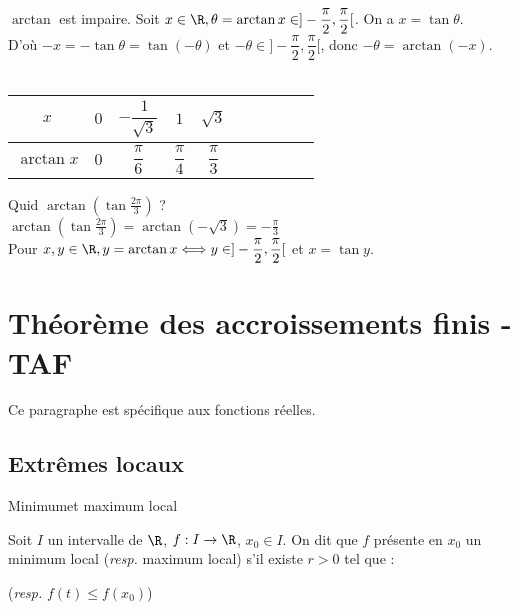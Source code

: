 \documentclass[12pt,a4paper]{report}
\begin{document}
\begin{exemple}[Exemples]{}
\begin{enumerate}
	\begin{remarque}
		$\arctan$ est impaire. Soit $x \in \R, \theta = \arctan x \in ]-\dfrac{\pi}{2},\dfrac{\pi}{2}[$. On a $x = \tan \theta$. \\
		D'où $-x = -\tan \theta = \tan(-\theta)$ et $-\theta \in ]-\dfrac{\pi}{2},\dfrac{\pi}{2}[$, donc $-\theta = \arctan(-x)$. \\
		\\
		\begin{center}
		    \begin{tabular}{|Sc|Sc|Sc|Sc|Sc|}
            \hline
            $x$ & $0$ & $-\dfrac{1}{\sqrt{3}}$ & $1$ & $\sqrt{3}$ \\
            \hline
            $\arctan x$ & $0$ & $\dfrac{\pi}{6}$ & $\dfrac{\pi}{4}$ & $\dfrac{\pi}{3}$ \\
            \hline
            \end{tabular}
		\end{center}
		Quid $\arctan(\tan \frac{2\pi}{3})$ ? \\
		$\arctan(\tan \frac{2\pi}{3}) = \arctan(-\sqrt{3}) = -\frac{\pi}{3}$ \\
		Pour $x,y \in \R, y = \arctan x \Longleftrightarrow y \in ]-\dfrac{\pi}{2},\dfrac{\pi}{2}[$ et $x = \tan y$.
	\end{remarque}
	
\end{enumerate}
\end{exemple}

\pagebreak

\section{Théorème des accroissements finis - TAF}
Ce paragraphe est spécifique aux fonctions réelles. 

\subsection{Extrêmes locaux}
\begin{definition}{Minimum\footnotemark et maximum local}{}

Soit $I$ un intervalle de $\R$, $f:I \to \R$, $x_0 \in I$. On dit que $f$ présente en $x_0$ un minimum local (\textit{resp.} maximum local) s'il existe $r>0$ tel que :
\begin{center}
     (\textit{resp.} $f(t)\leq f(x_0)$)
\end{center}
\end{definition}
\end{document}
